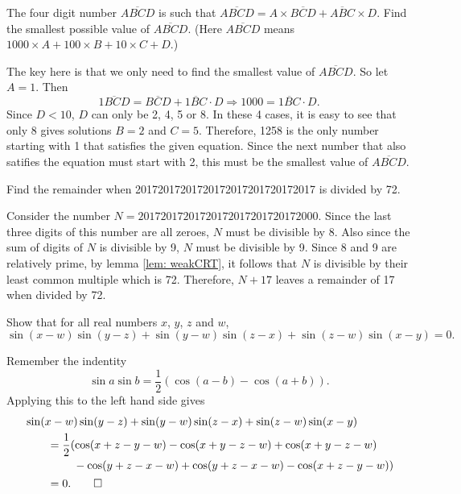 \begin{question}
    The four digit number $\overline{ABCD}$ is such that $\overline{ABCD} = A
    \times \overline{BCD} + \overline{ABC} \times D$. Find the smallest
    possible value of $\overline{ABCD}$. (Here $\overline{ABCD}$ means $1000
    \times A + 100 \times B + 10 \times C + D$.)
\end{question}
\begin{solution}
    The key here is that we only need to find the smallest value of
    $\overline{ABCD}$. So let $A = 1$. Then
    \[ \overline{1BCD} = \overline{BCD} + \overline{1BC} \cdot D \Longrightarrow 1000 = \overline{1BC} \cdot D. \]
    Since $D < 10$, $D$ can only be 2, 4, 5 or 8. In these 4 cases, it is easy
    to see that only 8 gives solutions $B = 2$ and $C = 5$. Therefore, 1258 is
    the only number starting with 1 that satisfies the given equation. Since
    the next number that also satifies the equation must start with 2, this
    must be the smallest value of $\overline{ABCD}$.  
\end{solution}

\begin{question}
    Find the remainder when 20172017201720172017201720172017 is divided by 72.
\end{question}
\begin{solution}
    Consider the number $N = 20172017201720172017201720172000$. Since the last
    three digits of this number are all zeroes, $N$ must be divisible by 8.
    Also since the sum of digits of $N$ is divisible by 9, $N$ must be
    divisible by 9. Since 8 and 9 are relatively prime, by lemma \ref{lem:
    weakCRT}, it follows that $N$ is divisible by their least common multiple
    which is 72. Therefore, $N + 17$ leaves a remainder of 17 when divided by
    72.
\end{solution}

\begin{question}
    Show that for all real numbers $x$, $y$, $z$ and $w$, 
    \[\sin(x - w)\sin(y - z) + \sin(y - w)\sin(z - x) + \sin(z - w)\sin(x - y) = 0.\]
\end{question}
\begin{solution}
    Remember the indentity
    \[ \sin a \sin b = \frac{1}{2}(\cos (a - b) - \cos (a + b)). \]
    Applying this to the left hand side gives
    \begin{align*}
        \MoveEqLeft
    \sin(x - w)\sin(y - z) + \sin(y - w)\sin(z - x) + \sin(z - w)\sin(x - y)\\
        & = \begin{multlined}[t] 
            \frac{1}{2}(\cos(x + z - y - w) - \cos(x + y - z - w) + \cos (x + y - z - w)\\
            - \cos(y + z - x - w) + \cos(y + z - x - w) - \cos(x + z - y - w))
            \end{multlined}\\
        & = 0. \qedhere
    \end{align*}
\end{solution}

